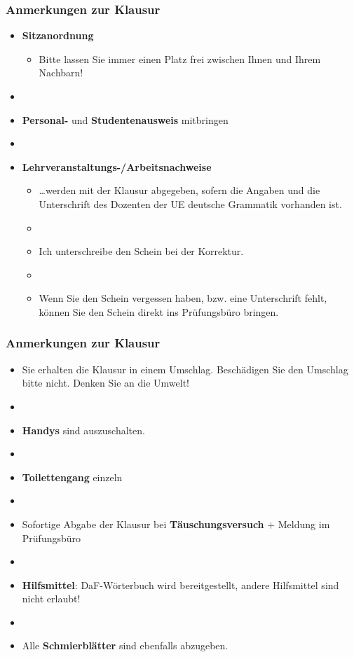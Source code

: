 \begin{frame}
\frametitle{Anmerkungen zur Klausur}

\begin{itemize}

	\item \textbf{Sitzanordnung}
	\begin{itemize}
		\item Bitte lassen Sie immer einen Platz frei zwischen Ihnen und Ihrem Nachbarn!
	\end{itemize}
	\item[]
	\item \textbf{Personal-} und \textbf{Studentenausweis} mitbringen
	\item[]
	\item \textbf{Lehrveranstaltungs-/Arbeitsnachweise}
	\begin{itemize}
	
	 	\item \dots werden mit der Klausur abgegeben, sofern die Angaben und die Unterschrift des Dozenten der UE deutsche Grammatik vorhanden ist.
	 	\item[]
	 	\item Ich unterschreibe den Schein bei der Korrektur.
	 	\item[]
	 	\item Wenn Sie den Schein vergessen haben, bzw. eine Unterschrift fehlt, können Sie den Schein direkt ins Prüfungsbüro bringen.
	
	\end{itemize}
	
\end{itemize}

\end{frame}


\begin{frame}
\frametitle{Anmerkungen zur Klausur}

\begin{itemize}
	\item Sie erhalten die Klausur in einem Umschlag. Beschädigen Sie den Umschlag bitte nicht. Denken Sie an die Umwelt!
	\item[]
	\item \textbf{Handys} sind auszuschalten. 
	\item[]
	\item \textbf{Toilettengang} einzeln
	\item[]
	\item Sofortige Abgabe der Klausur bei \textbf{Täuschungsversuch} $+$ Meldung im Prüfungsbüro
	\item[]
	\item \textbf{Hilfsmittel}: DaF-Wörterbuch wird bereitgestellt, andere Hilfsmittel sind nicht erlaubt!
	\item[]
	\item Alle \textbf{Schmierblätter} sind ebenfalls abzugeben.
	
\end{itemize}

\end{frame}

